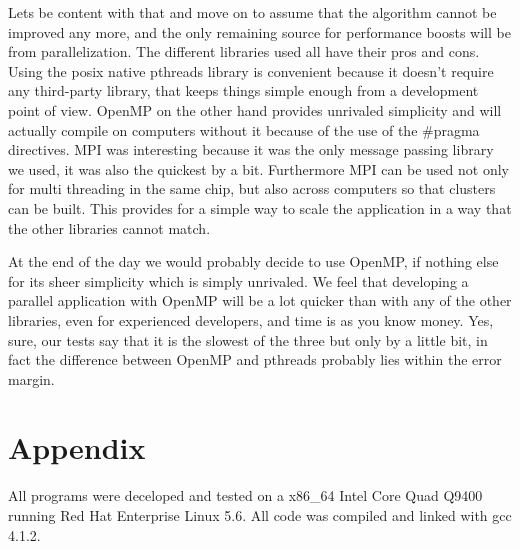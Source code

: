 \documentclass[11pt,a4paper]{article}
\begin{document}
Lets be content with that and move on to assume that the algorithm cannot be improved any more, and the only remaining source for performance boosts will be from parallelization. The different libraries used  all have their pros and cons. Using the posix native pthreads library is convenient because it doesn't require any third-party library, that keeps things simple enough from a development point of view. OpenMP on the other hand provides unrivaled simplicity and will actually compile on computers without it because of the use of the #pragma directives. MPI was interesting because it was the only message passing library we used, it was also the quickest by a bit. Furthermore MPI can be used not only for multi threading in the same chip, but also across computers so that clusters can be built. This provides for a simple way to scale the application in a way that the other libraries cannot match.

At the end of the day we would probably decide to use OpenMP, if nothing else for its sheer simplicity which is simply unrivaled. We feel that developing a parallel application with OpenMP will be a lot quicker than with any of the other libraries, even for experienced developers, and time is as you know money. Yes, sure, our tests say that it is the slowest of the three but only by a little bit, in fact the difference between OpenMP and pthreads probably lies within the error margin.
\section{Appendix}
All programs were deceloped and tested on a x86_64 Intel Core Quad Q9400 running Red Hat Enterprise Linux 5.6. All code was compiled and linked with gcc 4.1.2. 
\end{document}

